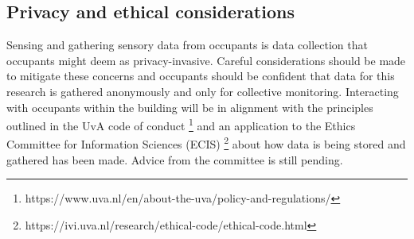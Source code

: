 \subsection{Privacy and ethical considerations}
Sensing and gathering sensory data from occupants is data collection that occupants might deem as privacy-invasive. Careful considerations should be made to mitigate these concerns and occupants should be confident that data for this research is gathered anonymously and only for collective monitoring. Interacting with occupants within the building will be in alignment with the principles outlined in the UvA code of conduct \footnote{https://www.uva.nl/en/about-the-uva/policy-and-regulations/} and an application to the Ethics Committee for Information Sciences (ECIS) \footnote{https://ivi.uva.nl/research/ethical-code/ethical-code.html} about how data is being stored and gathered has been made. Advice from the committee is still pending.